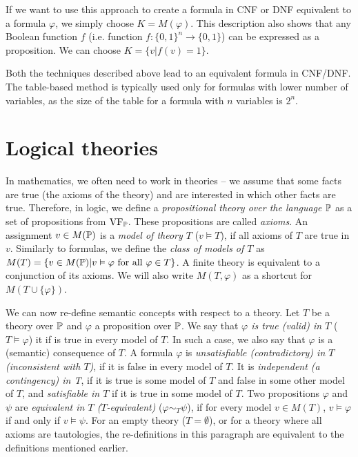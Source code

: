 If we want to use this approach to create a formula in CNF or DNF equivalent to a formula $\varphi$, we simply choose $K=M(\varphi)$. This description also shows that any Boolean function $f$ (i.e. function $f: \{0,1\}^n \to \{0,1\}$) can be expressed as a proposition. We can choose $K = \{v | f(v) = 1\}$. 

Both the techniques described above lead to an equivalent formula in CNF/DNF. The table-based method is typically used only for formulas with lower number of variables, as the size of the table for a formula with $n$ variables is $2^n$.

\section{Logical theories}

In mathematics, we often need to work in theories -- we assume that some facts are true (the axioms of the theory) and are interested in which other facts are true. Therefore, in logic, we define a \emph{propositional theory over the language $\mathbb{P}$} as a set of propositions from $\operatorname{VF}_\mathbb{P}$. These propositions are called \emph{axioms}. An assignment $v \in M(\mathbb{P})$ is a \emph{model of theory $T$} ($v \vDash T$), if all axioms of $T$ are true in $v$. Similarly to formulas, we define the \emph{class of models of $T$} as $M(T) = \{v \in M(\mathbb{P}) | v \vDash \varphi \text{ for all } \varphi \in T\}$. A finite theory is equivalent to a conjunction of its axioms. We will also write $M(T, \varphi)$ as a shortcut for $M(T \cup \{\varphi\})$.

We can now re-define semantic concepts with respect to a theory. Let $T$ be a theory over $\mathbb{P}$ and $\varphi$ a proposition over $\mathbb{P}$. We say that \emph{$\varphi$ is true (valid) in $T$} ($T\vDash \varphi$) it if is true in every model of $T$. In such a case, we also say that $\varphi$ is a (semantic) consequence of $T$. A formula $\varphi$ is \emph{unsatisfiable (contradictory) in $T$ (inconsistent with $T$)}, if it is false in every model of $T$. It is \emph{independent (a contingency) in T}, if it is true is some model of $T$ and false in some other model of $T$, and \emph{satisfiable in $T$} if it is true in some model of $T$. Two propositions $\varphi$ and $\psi$ are \emph{equivalent in $T$ ($T$-equivalent)} ($\varphi \sim_T \psi$), if for every model $v \in M(T)$, $v \vDash \varphi$ if and only if $v \vDash \psi$. For an empty theory ($T = \emptyset$), or for a theory where all axioms are tautologies, the re-definitions in this paragraph are equivalent to the definitions mentioned earlier.

